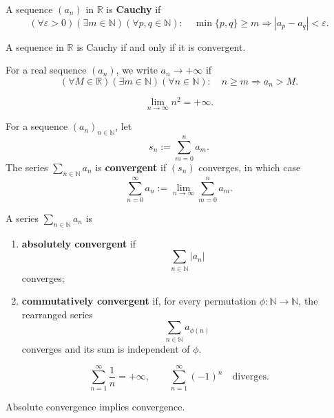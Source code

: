 \begin{definitionenv}
A sequence $(a_n)$ in $\mathbb R$ is \textbf{Cauchy} if
\[
    (\forall\varepsilon>0)(\exists m\in\mathbb N)
    (\forall p,q\in\mathbb N):
    \quad
    \min\{p,q\}\ge m
    \Longrightarrow
    |a_p-a_q|<\varepsilon.
\]
\end{definitionenv}

\begin{theoremenv}
A sequence in $\mathbb R$ is Cauchy if and only if it is convergent.
\end{theoremenv}

\begin{definitionenv}
For a real sequence $(a_n)$, we write $a_n\to+\infty$ if
\[
    (\forall M\in\mathbb R)(\exists m\in\mathbb N)(\forall n\in\mathbb N):
    \quad
    n\ge m\Longrightarrow a_n>M.
\]
\end{definitionenv}

\begin{exampleenv}
\[
    \lim_{n\to\infty}n^2=+\infty.
\]
\end{exampleenv}

\begin{definitionenv}
For a sequence $(a_n)_{n\in\mathbb N}$, let
\[
    s_n:=\sum_{m=0}^{n}a_m.
\]
The series $\sum_{n\in\mathbb N}a_n$ is \textbf{convergent} if $(s_n)$
converges, in which case
\[
    \sum_{n=0}^{\infty}a_n
    :=
    \lim_{n\to\infty}\sum_{m=0}^{n}a_m.
\]
\end{definitionenv}

\begin{definitionenv}
A series $\sum_{n\in\mathbb N}a_n$ is
\begin{enumerate}[label=(\arabic*)]
    \item \textbf{absolutely convergent} if
    \[
        \sum_{n\in\mathbb N}|a_n|
    \]
    converges;
    \item \textbf{commutatively convergent} if, for every permutation
    $\phi:\mathbb N\to\mathbb N$, the rearranged series
    \[
        \sum_{n\in\mathbb N}a_{\phi(n)}
    \]
    converges and its sum is independent of $\phi$.
\end{enumerate}
\end{definitionenv}

\begin{exampleenv}
\[
    \sum_{n=1}^{\infty}\frac1n=+\infty,
    \qquad
    \sum_{n=1}^{\infty}(-1)^n
    \quad\text{diverges}.
\]
\end{exampleenv}

\begin{propositionenv}
Absolute convergence implies convergence.
\end{propositionenv}

